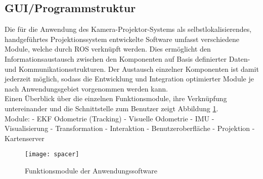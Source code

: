 \subsection{GUI/Programmstruktur}
Die für die Anwendung des Kamera-Projektor-Systems als selbstlokalisierendes, handgeführtes Projektionssystem entwickelte Software umfasst verschiedene Module, welche durch ROS verknüpft werden. Dies ermöglicht den Informationsaustausch zwischen den Komponenten auf Basis definierter Daten- und Kommunikationsstrukturen. Der Austausch einzelner Komponenten ist damit jederzeit möglich, sodass die Entwicklung und Integration optimierter Module je nach Anwendungsgebiet vorgenommen werden kann.\\
Einen Überblick über die einzelnen Funktionsmodule, ihre Verknüpfung untereinander und die Schnittstelle zum Benutzer zeigt Abbildung \ref{fig.modules}.\\

Module: \mLocalization - EKF Odometrie (Tracking) - Visuelle Odometrie - IMU - Visualisierung - Transformation - Interaktion - Benutzeroberfläche - Projektion - Kartenserver

\begin{figure}[ht]
	\begin{center}
		\texttt{[image: spacer]}
		\caption{Funktionsmodule der Anwendungssoftware}
		\label{fig.modules}
	\end{center}
\end{figure}

